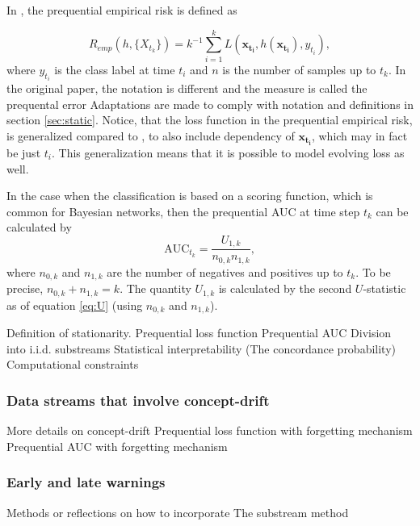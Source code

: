 In \cite{Gam13}, the prequential empirical risk is defined as 

\begin{equation}
\label{eq:prequentialRisk}
R_{emp}(h, \{X_{t_k}\}) = k^{-1} \sum_{i=1}^k L(\bm{x_{t_i}} , h(\bm{x_{t_i}} ), y_{t_i}),
\end{equation}
where $y_{t_i}$ is the class label at time $t_i$ and $n$ is the number of samples up to $t_k$.  In the original paper, the notation is different and the measure is called the prequental error  Adaptations are made to comply with notation and definitions in section \ref{sec:static}.  Notice, that the loss function in the prequential empirical risk, is generalized compared to \cite{Gam13}, to also include dependency of $\bm{x_{t_i}}$, which may in fact be just $t_i$.  This generalization means that it is possible to model evolving loss as well.

In the case when the classification is based on a scoring function, which is common for Bayesian networks, then
the prequential AUC at time step $t_k$ can be calculated by
\begin{equation}
\label{eq:prequentialAUC}
\mbox{AUC}_{t_k}= \frac{U_{1,k}}{n_{0,k}n_{1,k}},
\end{equation}
where $n_{0,k}$ and $n_{1,k}$ are the number of negatives and positives up to $t_k$.  To be precise, $n_{0,k} + n_{1,k} = k$.  The quantity $U_{1,k}$ is calculated by the second $U$-statistic as of equation \eqref{eq:U} (using $n_{0,k}$ and $n_{1,k}$).




Definition of stationarity.
Prequential loss function
Prequential AUC
Division into i.i.d. substreams
Statistical interpretability (The concordance probability)
Computational constraints
\subsubsection{Data streams that involve concept-drift}
More details on concept-drift
Prequential loss function with forgetting mechanism
Prequential AUC with forgetting mechanism
\subsubsection{Early and late warnings}
Methods or reflections on how to incorporate
The substream method

